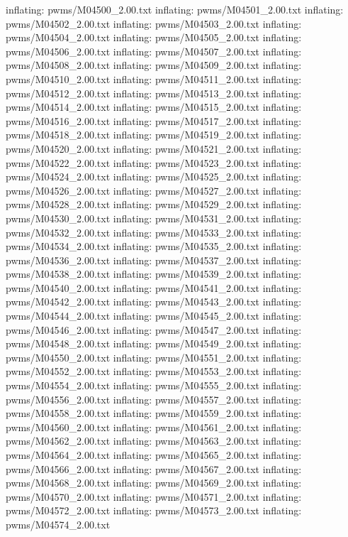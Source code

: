 \documentclass[letterpaper,10pt,english]{sphinxmanual}
\begin{document}
{\begin{sphinxVerbatim}[commandchars=\\\{\}]
  inflating: pwms/M04500\_2.00.txt
  inflating: pwms/M04501\_2.00.txt
  inflating: pwms/M04502\_2.00.txt
  inflating: pwms/M04503\_2.00.txt
  inflating: pwms/M04504\_2.00.txt
  inflating: pwms/M04505\_2.00.txt
  inflating: pwms/M04506\_2.00.txt
  inflating: pwms/M04507\_2.00.txt
  inflating: pwms/M04508\_2.00.txt
  inflating: pwms/M04509\_2.00.txt
  inflating: pwms/M04510\_2.00.txt
  inflating: pwms/M04511\_2.00.txt
  inflating: pwms/M04512\_2.00.txt
  inflating: pwms/M04513\_2.00.txt
  inflating: pwms/M04514\_2.00.txt
  inflating: pwms/M04515\_2.00.txt
  inflating: pwms/M04516\_2.00.txt
  inflating: pwms/M04517\_2.00.txt
  inflating: pwms/M04518\_2.00.txt
  inflating: pwms/M04519\_2.00.txt
  inflating: pwms/M04520\_2.00.txt
  inflating: pwms/M04521\_2.00.txt
  inflating: pwms/M04522\_2.00.txt
  inflating: pwms/M04523\_2.00.txt
  inflating: pwms/M04524\_2.00.txt
  inflating: pwms/M04525\_2.00.txt
  inflating: pwms/M04526\_2.00.txt
  inflating: pwms/M04527\_2.00.txt
  inflating: pwms/M04528\_2.00.txt
  inflating: pwms/M04529\_2.00.txt
  inflating: pwms/M04530\_2.00.txt
  inflating: pwms/M04531\_2.00.txt
  inflating: pwms/M04532\_2.00.txt
  inflating: pwms/M04533\_2.00.txt
  inflating: pwms/M04534\_2.00.txt
  inflating: pwms/M04535\_2.00.txt
  inflating: pwms/M04536\_2.00.txt
  inflating: pwms/M04537\_2.00.txt
  inflating: pwms/M04538\_2.00.txt
  inflating: pwms/M04539\_2.00.txt
  inflating: pwms/M04540\_2.00.txt
  inflating: pwms/M04541\_2.00.txt
  inflating: pwms/M04542\_2.00.txt
  inflating: pwms/M04543\_2.00.txt
  inflating: pwms/M04544\_2.00.txt
  inflating: pwms/M04545\_2.00.txt
  inflating: pwms/M04546\_2.00.txt
  inflating: pwms/M04547\_2.00.txt
  inflating: pwms/M04548\_2.00.txt
  inflating: pwms/M04549\_2.00.txt
  inflating: pwms/M04550\_2.00.txt
  inflating: pwms/M04551\_2.00.txt
  inflating: pwms/M04552\_2.00.txt
  inflating: pwms/M04553\_2.00.txt
  inflating: pwms/M04554\_2.00.txt
  inflating: pwms/M04555\_2.00.txt
  inflating: pwms/M04556\_2.00.txt
  inflating: pwms/M04557\_2.00.txt
  inflating: pwms/M04558\_2.00.txt
  inflating: pwms/M04559\_2.00.txt
  inflating: pwms/M04560\_2.00.txt
  inflating: pwms/M04561\_2.00.txt
  inflating: pwms/M04562\_2.00.txt
  inflating: pwms/M04563\_2.00.txt
  inflating: pwms/M04564\_2.00.txt
  inflating: pwms/M04565\_2.00.txt
  inflating: pwms/M04566\_2.00.txt
  inflating: pwms/M04567\_2.00.txt
  inflating: pwms/M04568\_2.00.txt
  inflating: pwms/M04569\_2.00.txt
  inflating: pwms/M04570\_2.00.txt
  inflating: pwms/M04571\_2.00.txt
  inflating: pwms/M04572\_2.00.txt
  inflating: pwms/M04573\_2.00.txt
  inflating: pwms/M04574\_2.00.txt

\end{sphinxVerbatim}}
\end{document}
